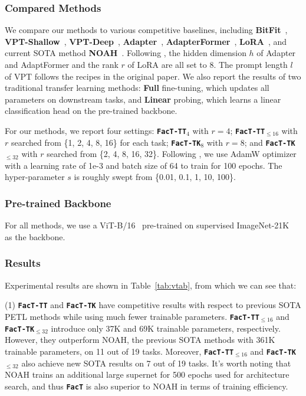 \subsubsection{Compared Methods} We compare our methods to various competitive baselines, including \textbf{BitFit}~\cite{bitfit}, \textbf{VPT-Shallow}~\cite{vpt}, \textbf{VPT-Deep}~\cite{vpt}, \textbf{Adapter}~\cite{adapterp,compactor}, \textbf{AdapterFormer}~\cite{adaptformer}, \textbf{LoRA}~\cite{lora}, and current SOTA method \textbf{NOAH}~\cite{noah}. Following \citet{noah}, the hidden dimension $h$ of Adapter and AdaptFormer and the rank $r$ of LoRA are all set to 8. The prompt length $l$ of VPT follows the recipes in the original paper. We also report the results of two traditional transfer learning methods: \textbf{Full} fine-tuning, which updates all parameters on downstream tasks, and \textbf{Linear} probing, which learns a linear classification head on the pre-trained backbone. 

For our methods, we report four settings: \texttt{\textbf{FacT-TT}}${_4}$ with $r=4$; \texttt{\textbf{FacT-TT}}$_{\leq 16}$ with $r$ searched from \{1, 2, 4, 8, 16\} for each task; \texttt{\textbf{FacT-TK}}$_{8}$ with $r=8$; and \texttt{\textbf{FacT-TK}}$_{\leq 32}$ with $r$ searched from \{2, 4, 8, 16, 32\}. Following \citet{noah}, we use AdamW optimizer with a learning rate of 1e-3 and batch size of 64 to train for 100 epochs. The hyper-parameter $s$ is roughly swept from \{0.01, 0.1, 1, 10, 100\}.

\subsubsection{Pre-trained Backbone} For all methods, we use a ViT-B/16~\cite{vit} pre-trained on supervised ImageNet-21K~\cite{imagenet} as the backbone. 

\subsubsection{Results} Experimental results are shown in Table~\ref{tab:vtab}, from which we can see that:

(1) {\texttt{\textbf{FacT-TT}} and \texttt{\textbf{FacT-TK}} have competitive results with respect to previous SOTA PETL methods while using much fewer trainable parameters.} \texttt{\textbf{FacT-TT}}$_{\leq 16}$ and \texttt{\textbf{FacT-TK}}$_{\leq 32}$ introduce only 37K and 69K trainable parameters, respectively. However, they outperform NOAH, the previous SOTA methods with 361K trainable parameters, on 11 out of 19 tasks. Moreover, \texttt{\textbf{FacT-TT}}$_{\leq 16}$ and \texttt{\textbf{FacT-TK}}$_{\leq 32}$ also achieve new SOTA results on 7 out of 19 tasks. It's worth noting that NOAH trains an additional large supernet for 500 epochs used for architecture search, and thus \texttt{\textbf{FacT}} is also superior to NOAH in terms of training efficiency.

